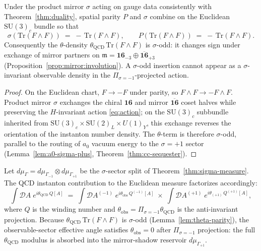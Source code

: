 \begin{lemma}
\label{lem:theta-parity}
Under the product mirror $\sigma$ acting on gauge data consistently with
Theorem~\ref{thm:duality}, spatial parity $P$ and $\sigma$ combine on the
Euclidean $\mathrm{SU}(3)_c$ bundle so that
\begin{equation}\label{eq:theta-sigma-odd}
  \sigma\!\left(\mathrm{Tr}(F\wedge F)\right)
  \;=\;
  -\,\mathrm{Tr}(F\wedge F),
  \qquad
  P\!\left(\mathrm{Tr}(F\wedge F)\right)
  \;=\;
  -\,\mathrm{Tr}(F\wedge F).
\end{equation}
Consequently the $\theta$-density $\theta_{\mathrm{QCD}}\,
\mathrm{Tr}(F\wedge F)$ is $\sigma$-odd: it changes sign under exchange of
mirror partners on $\mathfrak{m}=\mathbf{16}_{-3}\oplus\overline{\mathbf{16}}_{+3}$
(Proposition~\ref{prop:mirror:involution}). A $\sigma$-odd insertion cannot
appear as a $\sigma$-invariant observable density in the
$\Pi_{\sigma=-1}$-projected action.
\end{lemma}

\begin{proof}
On the Euclidean chart, $F\to -F$ under parity, so
$F\wedge F\to -F\wedge F$. Product mirror $\sigma$ exchanges the chiral
$\mathbf{16}$ and mirror $\overline{\mathbf{16}}$ coset halves while
preserving the $H$-invariant action \eqref{eq:action}; on the $\mathrm{SU}(3)_c$
subbundle inherited from $\mathrm{SU}(3)_c\times\mathrm{SU}(2)_L\times U(1)_Y$,
this exchange reverses the orientation of the instanton number density.
The $\theta$-term is therefore $\sigma$-odd, parallel to the routing of
$a_0$ vacuum energy to the $\sigma=+1$ sector
(Lemma~\ref{lem:a0-sigma-plus}, Theorem~\ref{thm:cc-sequester}).
\end{proof}

\begin{proposition}
\label{prop:theta-measure}
Let $d\mu_\Gamma=d\mu_{\Gamma_{-1}}\otimes d\mu_{\Gamma_{+1}}$ be the
$\sigma$-sector split of Theorem~\ref{thm:sigma-measure}. The QCD instanton
contribution to the Euclidean measure factorizes accordingly:
\begin{equation}\label{eq:theta-measure}
  \int \mathcal{D}A\;
  e^{i\theta_{\mathrm{QCD}}\,Q[A]}
  \;=\;
  \int \mathcal{D}A^{(-1)}\;
  e^{i\theta_{\mathrm{obs}}\,Q^{(-1)}[A]}
  \;\times\;
  \int \mathcal{D}A^{(+1)}\;
  e^{i\theta_{(+1)}\,Q^{(+1)}[A]},
\end{equation}
where $Q$ is the winding number and
$\theta_{\mathrm{obs}}=\Pi_{\sigma=-1}\theta_{\mathrm{QCD}}$ is the
anti-invariant projection. Because
$\theta_{\mathrm{QCD}}\,\mathrm{Tr}(F\wedge F)$ is $\sigma$-odd
(Lemma~\ref{lem:theta-parity}), the observable-sector effective angle satisfies
$\theta_{\mathrm{obs}}=0$ after $\Pi_{\sigma=-1}$ projection: the full
$\theta_{\mathrm{QCD}}$ modulus is absorbed into the mirror-shadow reservoir
$d\mu_{\Gamma_{+1}}$.
\end{proposition}

